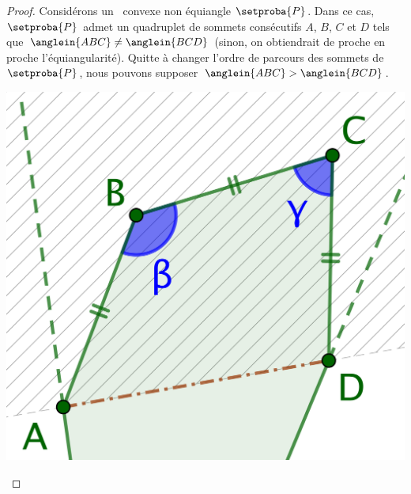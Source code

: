 \begin{proof}
	Considérons un \nequi\ convexe non équiangle $\setproba{P}$.
	Dans ce cas, $\setproba{P}$ admet un quadruplet de sommets consécutifs $A$, $B$, $C$ et $D$ tels que $\anglein{ABC} \neq \anglein{BCD}$
	(sinon, on obtiendrait de proche en proche l'équiangularité).
	Quitte à changer l'ordre de parcours des sommets de $\setproba{P}$, nous pouvons supposer $\anglein{ABC} > \anglein{BCD}$.
	\begin{center}
		\includegraphics[scale=.4]{content/polygon/sol-must-be/2-eq-angles-start.png}
	\end{center}
	

\end{proof}
